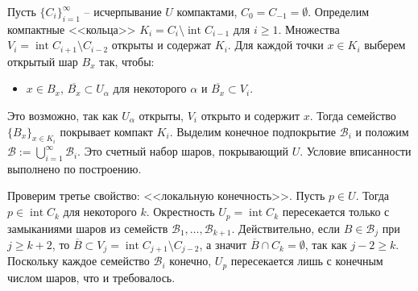 \begin{myproof}
	Пусть $\{C_i\}_{i=1}^{\infty}$ -- исчерпывание $U$ компактами, $C_0 = C_{-1} = \emptyset$. 
	Определим компактные <<кольца>> $K_i = C_i \setminus \operatorname{int} C_{i-1}$ для $i \geq 1$. 
	Множества $V_i = \operatorname{int} C_{i+1} \setminus C_{i-2}$ открыты и содержат $K_i$. 
	Для каждой точки $x \in K_i$ выберем открытый шар $B_x$ так, чтобы: 
	\begin{itemize}[itemsep = 0pt, topsep = 5pt]
		\item $x \in B_x$, $\overline{B_x} \subset U_{\alpha}$ для некоторого $\alpha$ и $\overline{B_x} \subset V_i$.
	\end{itemize}
	Это возможно, так как $U_{\alpha}$ открыты, $V_i$ открыто и содержит $x$. 
	Тогда семейство $\{B_x\}_{x \in K_i}$ покрывает компакт $K_i$. 
	Выделим конечное подпокрытие $\mathcal{B}_i$ и положим $\mathcal{B} := \bigcup_{i=1}^{\infty} \mathcal{B}_i$. 
	Это счетный набор шаров, покрывающий $U$. Условие вписанности выполнено по построению. 

	\vspace{5pt}
	Проверим третье свойство: <<локальную конечность>>. Пусть $p \in U$. 
	Тогда $p \in \operatorname{int} C_k$ для некоторого $k$. 
	Окрестность $U_p = \operatorname{int} C_k$ пересекается только с замыканиями шаров из семейств $\mathcal{B}_1, \dotsc, \mathcal{B}_{k+1}$. 
	Действительно, если $B \in \mathcal{B}_j$ при $j \ge k+2$, то $\overline{B} \subset V_j = \operatorname{int} C_{j+1} \setminus C_{j-2}$, а значит $\overline{B} \cap C_k = \emptyset$, так как $j-2 \ge k$.
	Поскольку каждое семейство $\mathcal{B}_i$ конечно, $U_p$ пересекается лишь с конечным числом шаров, что и требовалось.
\end{myproof}